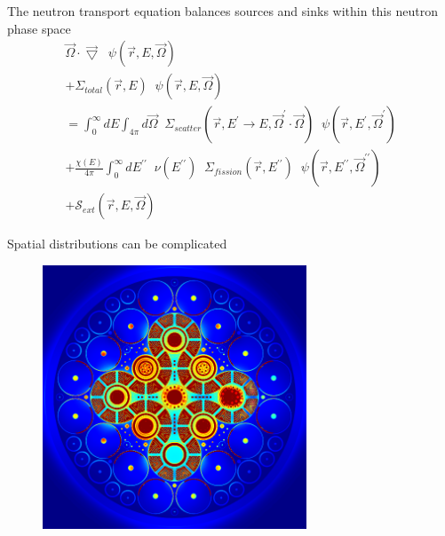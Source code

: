 \documentclass{beamer}
\begin{document}
    \begin{frame}{The neutron transport equation balances sources and sinks within this neutron phase space}
        \begin{equation*}
            \begin{split}
                \vec \Omega \cdot \vec \bigtriangledown \; \; \psi(\vec r, E, \vec \Omega) \\
                + \Sigma_{total}(\vec r, E) \; \; \psi(\vec r, E, \vec\Omega) \\
                = \int_0^\infty \! \! \! \! dE \int_{4\pi} \! \! \! \! d\vec\Omega \; \; \Sigma_{scatter}(\vec r, E^\prime \rightarrow E, \vec \Omega^\prime \cdot \vec \Omega) \; \; \psi(\vec r, E^\prime, \vec\Omega^\prime) \\
                + \frac{\chi(E)}{4\pi} \int_0^\infty \! \! \! \! dE^{\prime\prime} \; \; \nu (E^{\prime\prime}) \; \; \Sigma_{fission}(\vec r, E^{\prime\prime}) \; \; \psi(\vec r, E^{\prime\prime}, \vec\Omega^{\prime\prime}) \\
                + \mathcal{S}_{ext}(\vec r, E, \vec\Omega)
            \end{split}
        \end{equation*}
    \end{frame}

    \begin{frame}{Spatial distributions can be complicated}
        \begin{figure}
            \centering
            \includegraphics[width=0.7\textwidth]{./img/spaceFlux1.png}
            \caption*{}
        \end{figure}
    \end{frame}
\end{document}
